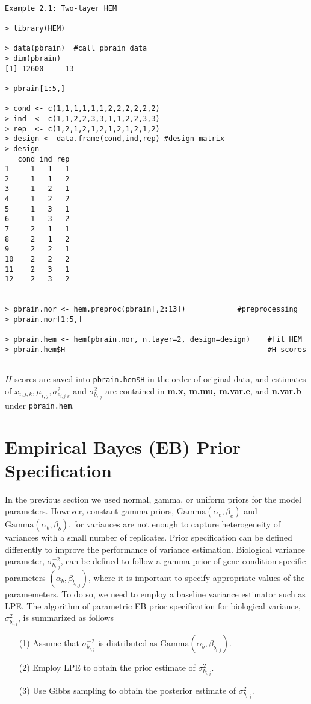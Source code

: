 \documentclass[12pt]{article}
\newcommand{\Robject}[1]{{\texttt{#1}}}
\begin{document}
\begin{verbatim}

Example 2.1: Two-layer HEM

> library(HEM)

> data(pbrain)  #call pbrain data
> dim(pbrain)
[1] 12600     13

> pbrain[1:5,]

> cond <- c(1,1,1,1,1,1,2,2,2,2,2,2)
> ind  <- c(1,1,2,2,3,3,1,1,2,2,3,3)
> rep  <- c(1,2,1,2,1,2,1,2,1,2,1,2)
> design <- data.frame(cond,ind,rep) #design matrix
> design
   cond ind rep
1     1   1   1
2     1   1   2
3     1   2   1
4     1   2   2
5     1   3   1
6     1   3   2
7     2   1   1
8     2   1   2
9     2   2   1
10    2   2   2
11    2   3   1
12    2   3   2


> pbrain.nor <- hem.preproc(pbrain[,2:13])            #preprocessing
> pbrain.nor[1:5,]

> pbrain.hem <- hem(pbrain.nor, n.layer=2, design=design)    #fit HEM
> pbrain.hem$H                                               #H-scores


\end{verbatim}
$H$-scores are saved into \Robject{pbrain.hem\$H} in the order of original data, 
and estimates of $x_{i,j,k}, \mu_{i,j}, \sigma^2_{e_{i,j,k}}$ and $\sigma^2_{b_{i,j}}$ are contained 
in {\bf m.x, m.mu, m.var.e}, and {\bf n.var.b} under \Robject{pbrain.hem}.



\section{Empirical Bayes (EB) Prior Specification}
In the previous section we used  normal, gamma, or uniform priors for the model parameters.
However, constant gamma priors, $\mbox{Gamma}(\alpha_e, \beta_e)$ and $\mbox{Gamma}(\alpha_b, \beta_b)$, for variances 
are not enough to capture heterogeneity of variances with a small number of replicates.
Prior specification can be defined differently to improve the performance of variance estimation.
Biological variance parameter, $\sigma^{-2}_{b_{i,j}}$, can be defined to follow 
a gamma prior of gene-condition specific parameters $(\alpha_b, \beta_{b_{i,j}})$, where
it is important to specify appropriate values of the paramemeters. 
To do so, we need to employ a baseline variance estimator such as LPE. 
The algorithm of parametric EB prior specification for biological variance, $\sigma^2_{b_{i,j}}$, is summarized as follows
\begin{itemize}
      \item[(1)] Assume that $\sigma^{-2}_{b_{i,j}}$ is distributed as $\mbox{Gamma}(\alpha_b,\beta_{b_{i,j}} )$.
      \item[(2)] Employ LPE to obtain the prior estimate of $\sigma^2_{b_{i,j}}$.
      \item[(3)] Use Gibbs sampling to obtain the posterior estimate of $\sigma^2_{b_{i,j}}$. 
\end{itemize}
\end{document}
